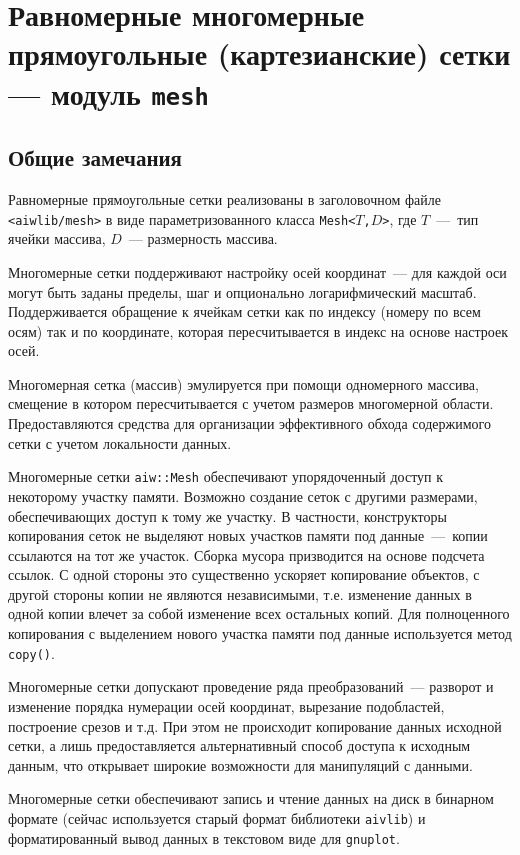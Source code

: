 \section{Равномерные многомерные прямоугольные (картезианские) сетки --- модуль {\tt mesh}}
\subsection{Общие замечания}
Равномерные прямоугольные сетки реализованы в заголовочном файле
{\tt <aiwlib/mesh>}  в виде параметризованного класса {\tt Mesh<$T$,$D$>}, где $T$~---~тип ячейки массива, $D$~---
размерность массива. 

Многомерные сетки поддерживают настройку осей координат~--- для каждой оси могут быть заданы пределы, шаг
и опционально логарифмический масштаб. Поддерживается обращение к ячейкам сетки как по индексу (номеру по всем осям)
так и по координате, которая пересчитывается в индекс на основе настроек осей.

Многомерная сетка (массив) эмулируется при помощи
одномерного массива, смещение в котором пересчитывается с учетом размеров
многомерной области. Предоставляются средства для организации эффективного обхода содержимого сетки  с учетом локальности данных.

Многомерные сетки {\tt aiw::Mesh} обеспечивают упорядоченный доступ к некоторому участку памяти.
Возможно создание сеток с другими размерами, обеспечивающих доступ
к тому же участку. В частности, конструкторы копирования сеток не
выделяют новых участков памяти под данные~---~копии ссылаются на тот же
участок. Сборка мусора призводится на основе подсчета ссылок.  С одной
стороны это существенно ускоряет копирование объектов, с другой стороны копии не являются
независимыми, т.е. изменение данных в одной копии влечет за собой изменение всех
остальных копий. Для полноценного копирования с выделением нового участка
памяти под данные используется метод {\tt copy()}.

Многомерные сетки допускают проведение ряда преобразований~--- разворот и изменение порядка нумерации осей координат, 
вырезание подобластей, построение срезов и т.д. При этом не происходит копирование данных исходной сетки, а лишь предоставляется 
альтернативный способ доступа к исходным данным, что открывает широкие возможности для манипуляций с данными.

Многомерные сетки обеспечивают запись и чтение данных на диск в бинарном формате (сейчас используется старый 
формат библиотеки {\tt aivlib}) и форматированный вывод данных в текстовом виде для {\tt gnuplot}. 

